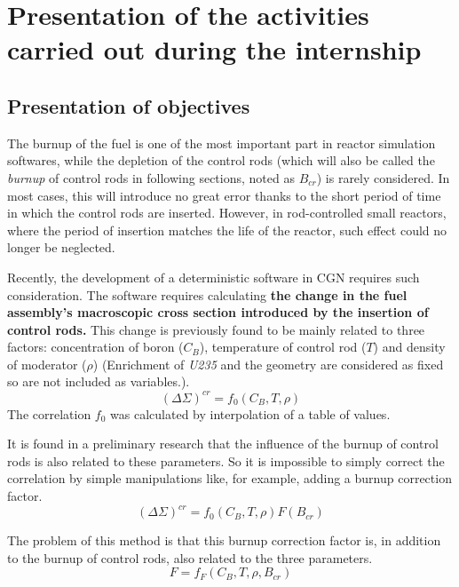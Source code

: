 \chapter{Presentation of the activities carried out during the internship}
\label{sec:introduction}
\section{Presentation of objectives}
\label{sec:purpose}

The burnup of the fuel is one of the most important part in reactor simulation softwares,
while the depletion of the control rods
(which will also be called the \textit{burnup} of control rods in following sections, noted as $B_{cr}$)
is rarely considered.
In most cases, this will introduce no great error thanks to the short period of time
in which the control rods are inserted.
However, in rod-controlled small reactors,
where the period of insertion matches the life of the reactor,
such effect could no longer be neglected.

Recently, the development of a deterministic software in CGN requires such consideration.
The software requires calculating \textbf{the change in the fuel assembly's macroscopic cross section introduced by the insertion of control rods.}
This change is previously found to be mainly related to three factors: concentration of boron ($C_B$),
temperature of control rod ($T$) and density of moderator ($\rho$)
(Enrichment of \textit{U235} and the geometry are considered as fixed so are not included as variables.).
\begin{equation}
    \label{eq:DeltaSigma_no_cr}
    (\Delta\Sigma)^{cr} = f_0(C_B, T, \rho)
\end{equation}
The correlation $f_0$ was calculated by interpolation of a table of values.


It is found in a preliminary research
that the influence of the burnup of control rods is also related to these parameters.
So it is impossible to simply correct the correlation by simple manipulations like, for example,
adding a burnup correction factor.
\begin{equation}
    \label{eq:DeltaSigmaF}
    (\Delta\Sigma)^{cr} = f_0(C_B, T, \rho)F(B_{cr})
\end{equation}

The problem of this method is that this burnup correction factor is,
in addition to the burnup of control rods,
also related to the three parameters.
\begin{equation}
    \label{eq:burnup_correction_factor}
    F = f_F(C_B, T, \rho, B_{cr})
\end{equation}


